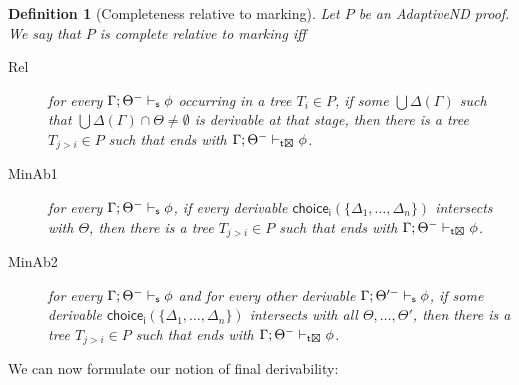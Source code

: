 \documentclass[]{article}
\newtheorem{definition}{Definition}
\begin{document}
\begin{definition}[Completeness relative to marking]
Let $P$ be an {\sf AdaptiveND} proof. We say that $P$ is complete relative to marking
iff
\begin{description}
    \item[Rel] for every $\Gamma; \Theta^{-}\vdash_{{\sf s}} \phi$ occurring in a tree $T_{i}\in P$, if some $\bigcup \Delta(\Gamma)$ such that $\bigcup \Delta(\Gamma) \cap \Theta \neq \emptyset$ is derivable at that stage, then there is a tree $T_{j>i}\in P$ such that ends with $\Gamma; \Theta^{-}\vdash_{{\sf t\XBox}} \phi$.
    \item[MinAb1] for every $\Gamma; \Theta^{-}\vdash_{{\sf s}} \phi$, if every derivable $\mathsf{choice_i}(\{\Delta_1, \ldots, \Delta_n\})$ intersects with $\Theta$, then there is a tree $T_{j>i}\in P$ such that ends with $\Gamma; \Theta^{-}\vdash_{{\sf t\XBox}} \phi$.
    \item[MinAb2] for every $\Gamma; \Theta^{-}\vdash_{{\sf s}} \phi$ and for every other derivable $\Gamma; \Theta'^{-}\vdash_{{\sf s}} \phi$, if some derivable
     $\mathsf{choice_i}(\{\Delta_1, \ldots, \Delta_n\})$ intersects with all $\Theta, \dots, \Theta'$, then there is a tree $T_{j>i}\in P$ such that ends with $\Gamma; \Theta^{-}\vdash_{{\sf t\XBox}} \phi$.

\end{description}



\end{definition}


We can now formulate our notion of final derivability:
\end{document}
